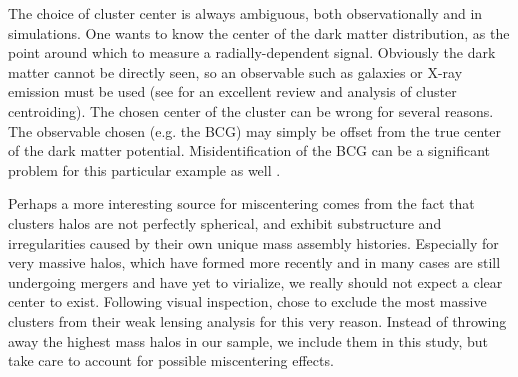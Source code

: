 \begin{table}
  \begin{center}
    \caption[Centroid Offset Fit Parameters]{{\bf Centroid Offset Fit Parameters.} Best Fit Rayleigh Distributions for the Cluster Miscentering in \autoref{plot:gauss3}.}
\label{table13}
  \end{center}
\end{table}

The choice of cluster center is always ambiguous, both observationally and in simulations. One wants to know the center of the dark matter distribution, as the point around which to measure a radially-dependent signal. Obviously the dark matter cannot be directly seen, so an observable such as galaxies or X-ray emission must be used (see \citet{George12} for an excellent review and analysis of cluster centroiding). The chosen center of the cluster can be wrong for several reasons. The observable chosen (e.g. the \ac{BCG}) may simply be offset from the true center of the dark matter potential. Misidentification of the \ac{BCG} can be a significant problem for this particular example as well \citep{Johnston07}. 

Perhaps a more interesting source for miscentering comes from the fact that clusters halos are not perfectly spherical, and exhibit substructure and irregularities caused by their own unique mass assembly histories. Especially for very massive halos, which have formed more recently and in many cases are still undergoing mergers and have yet to virialize, we really should not expect a clear center to exist. Following visual inspection, \citet{Mandelbaum08b} chose to exclude the most massive clusters from their weak lensing analysis for this very reason. Instead of throwing away the highest mass halos in our sample, we include them in this study, but take care to account for possible miscentering effects. 

